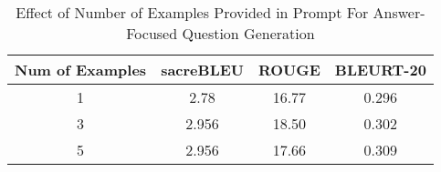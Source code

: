 \documentclass[11pt]{article}
\begin{document}
\\ 

\begin{table}[]
\begin{tabular}{|c|c|c|c|}
\hline\hline
\textbf{Num of Examples} & \textbf{sacreBLEU} & \textbf{ROUGE} & \textbf{BLEURT-20} \\
\hline\hline
1                        & 2.78               & 16.77          & 0.296              \\ \hline
3                        & 2.956              & 18.50          & 0.302              \\ \hline
5                        & 2.956              & 17.66          & 0.309              \\ \hline        
\end{tabular}
\caption{\label{citation-guide}
Effect of Number of Examples Provided in Prompt For Answer-Focused Question Generation}
\end{table}

\clearpage
\end{document}
